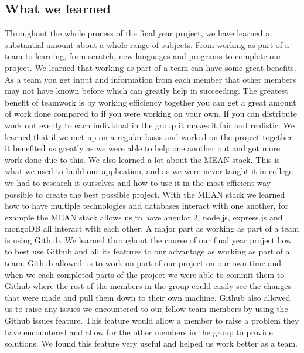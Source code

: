 \subsection{What we learned}
Throughout the whole process of the final year project, we have learned a substantial amount about a whole range of subjects. From working as part of a team to learning, from scratch, new languages and programs to complete our project. We learned that working as part of a team can have some great benefits. As a team you get input and information from each member that other members may not have known before which can greatly help in succeeding. The greatest benefit of teamwork is by working efficiency together you can get a great amount of work done compared to if you were working on your own. If you can distribute work out evenly to each individual in the group it makes it fair and realistic. We learned that if we met up on a regular basis and worked on the project together it benefited us greatly as we were able to help one another out and got more work done due to this. We also learned a lot about the MEAN stack. This is what we used to build our application, and as we were never taught it in college we had to research it ourselves and how to use it in the most efficient way possible to create the best possible project. With the MEAN stack we learned how to have multiple technologies and databases interact with one another, for example the MEAN stack allows us to have angular 2, node.js, express.js and mongoDB all interact with each other. A major part as working as part of a team is using Github. We learned throughout the course of our final year project how to best use Github and all its features to our advantage as working as part of a team. Github allowed us to work on part of our project on our own time and when we each completed parts of the project we were able to commit them to Github where the rest of the members in the group could easily see the changes that were made and pull them down to their own machine. Github also allowed us to raise any issues we encountered to our fellow team members by using the Github issues feature. This feature would allow a member to raise a problem they have encountered and allow for the other members in the group to provide solutions. We found this feature very useful and helped us work better as a team. 

